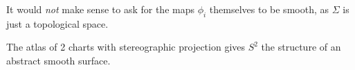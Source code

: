 \documentclass[a4paper]{scrartcl}
\begin{document}
\begin{remark}
    It would \emph{not} make sense to ask for the maps $\phi_i$ themselves to be smooth, as $\Sigma$ is just a topological space.
\end{remark}

\begin{example}
    The atlas of 2 charts with stereographic projection gives $S^2$ the structure of an abstract smooth surface.
\end{example}
\end{document}
